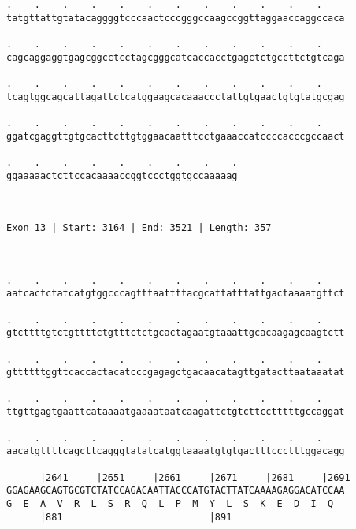 \documentclass{article}
\begin{document}
\begin{Verbatim}
.    .    .    .    .    .    .    .    .    .    .    .    
tatgttattgtatacaggggtcccaactcccgggccaagccggttaggaaccaggccaca
                                                            
.    .    .    .    .    .    .    .    .    .    .    .    
cagcaggaggtgagcggcctcctagcgggcatcaccacctgagctctgccttctgtcaga
                                                            
.    .    .    .    .    .    .    .    .    .    .    .    
tcagtggcagcattagattctcatggaagcacaaaccctattgtgaactgtgtatgcgag
                                                            
.    .    .    .    .    .    .    .    .    .    .    .    
ggatcgaggttgtgcacttcttgtggaacaatttcctgaaaccatccccacccgccaact
                                                            
.    .    .    .    .    .    .    .    .
ggaaaaactcttccacaaaaccggtccctggtgccaaaaag
                                         
                                         
 
Exon 13 | Start: 3164 | End: 3521 | Length: 357



.    .    .    .    .    .    .    .    .    .    .    .    
aatcactctatcatgtggcccagtttaattttacgcattatttattgactaaaatgttct
                                                            
.    .    .    .    .    .    .    .    .    .    .    .    
gtcttttgtctgttttctgtttctctgcactagaatgtaaattgcacaagagcaagtctt
                                                            
.    .    .    .    .    .    .    .    .    .    .    .    
gttttttggttcaccactacatcccgagagctgacaacatagttgatacttaataaatat
                                                            
.    .    .    .    .    .    .    .    .    .    .    .    
ttgttgagtgaattcataaaatgaaaataatcaagattctgtcttcctttttgccaggat
                                                            
.    .    .    .    .    .    .    .    .    .    .    .    
aacatgttttcagcttcagggtatatcatggtaaaatgtgtgactttccctttggacagg
                                                            
      |2641     |2651     |2661     |2671     |2681     |2691
GGAGAAGCAGTGCGTCTATCCAGACAATTACCCATGTACTTATCAAAAGAGGACATCCAA
G  E  A  V  R  L  S  R  Q  L  P  M  Y  L  S  K  E  D  I  Q  
      |881                          |891                    
  

\end{Verbatim}
\end{document}
